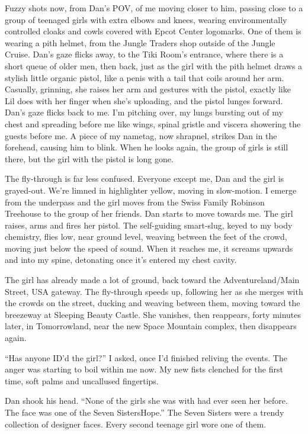 Fuzzy shots now, from Dan's POV, of me moving closer to him,
passing close to a group of teenaged girls with extra elbows and
knees, wearing environmentally controlled cloaks and cowls covered
with Epcot Center logomarks. One of them is wearing a pith helmet,
from the Jungle Traders shop outside of the Jungle Cruise. Dan's
gaze flicks away, to the Tiki Room's entrance, where there is a
short queue of older men, then back, just as the girl with the pith
helmet draws a stylish little organic pistol, like a penis with a
tail that coils around her arm. Casually, grinning, she raises her
arm and gestures with the pistol, exactly like Lil does with her
finger when she's uploading, and the pistol lunges forward. Dan's
gaze flicks back to me. I'm pitching over, my lungs bursting out of
my chest and spreading before me like wings, spinal gristle and
viscera showering the guests before me. A piece of my nametag, now
shrapnel, strikes Dan in the forehead, causing him to blink. When
he looks again, the group of girls is still there, but the girl
with the pistol is long gone.

The fly-through is far less confused. Everyone except me, Dan and
the girl is grayed-out. We're limned in highlighter yellow, moving
in slow-motion. I emerge from the underpass and the girl moves from
the Swiss Family Robinson Treehouse to the group of her friends.
Dan starts to move towards me. The girl raises, arms and fires her
pistol. The self-guiding smart-slug, keyed to my body chemistry,
flies low, near ground level, weaving between the feet of the
crowd, moving just below the speed of sound. When it reaches me, it
screams upwards and into my spine, detonating once it's entered my
chest cavity.

The girl has already made a lot of ground, back toward the
Adventureland/Main Street, USA gateway. The fly-through speeds up,
following her as she merges with the crowds on the street, ducking
and weaving between them, moving toward the breezeway at Sleeping
Beauty Castle. She vanishes, then reappears, forty minutes later,
in Tomorrowland, near the new Space Mountain complex, then
disappears again.

“Has anyone ID'd the girl?” I asked, once I'd finished reliving the
events. The anger was starting to boil within me now. My new fists
clenched for the first time, soft palms and uncallused fingertips.

Dan shook his head. “None of the girls she was with had ever seen
her before. The face was one of the Seven Sisters{\dash}Hope.” The Seven
Sisters were a trendy collection of designer faces. Every second
teenage girl wore one of them.

